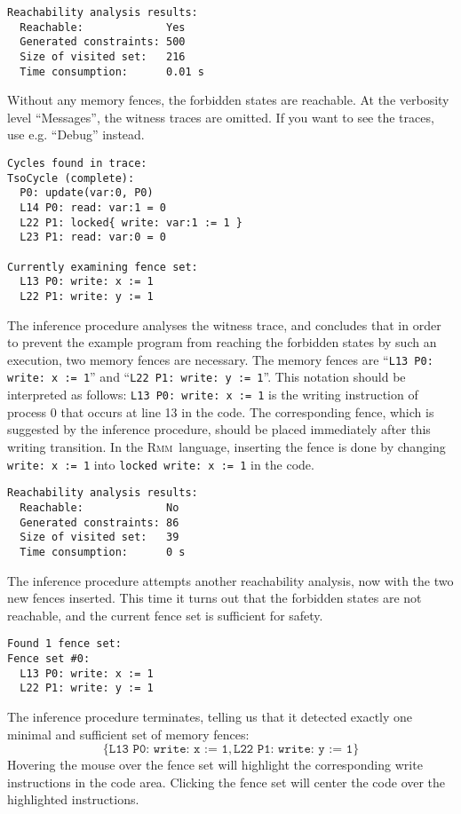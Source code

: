 \documentclass[a4paper]{article}
\newcommand{\rmm}{\textsc{Rmm}}
\begin{document}
\noindent
\begin{verbatim}
Reachability analysis results:
  Reachable:             Yes
  Generated constraints: 500
  Size of visited set:   216
  Time consumption:      0.01 s
\end{verbatim}

Without any memory fences, the forbidden states are reachable. At the
verbosity level ``Messages'', the witness traces are omitted. If you
want to see the traces, use e.g. ``Debug'' instead.

\noindent
\begin{verbatim}
Cycles found in trace:
TsoCycle (complete):
  P0: update(var:0, P0)
  L14 P0: read: var:1 = 0
  L22 P1: locked{ write: var:1 := 1 }
  L23 P1: read: var:0 = 0

Currently examining fence set:
  L13 P0: write: x := 1
  L22 P1: write: y := 1
\end{verbatim}

The inference procedure analyses the witness trace, and concludes that
in order to prevent the example program from reaching the forbidden
states by such an execution, two memory fences are necessary. The
memory fences are ``{\tt L13 P0: write: x := 1}'' and ``{\tt L22 P1:
  write: y := 1}''. This notation should be interpreted as follows:
{\tt L13 P0: write: x := 1} is the writing instruction of process 0
that occurs at line 13 in the code. The corresponding fence, which is
suggested by the inference procedure, should be placed immediately
after this writing transition. In the \rmm\ language, inserting the
fence is done by changing {\tt write: x := 1} into {\tt locked write:
  x := 1} in the code.

\noindent
\begin{verbatim}
Reachability analysis results:
  Reachable:             No
  Generated constraints: 86
  Size of visited set:   39
  Time consumption:      0 s
\end{verbatim}

The inference procedure attempts another reachability analysis, now
with the two new fences inserted. This time it turns out that the
forbidden states are not reachable, and the current fence set is
sufficient for safety.

\noindent
\begin{verbatim}
Found 1 fence set:
Fence set #0:
  L13 P0: write: x := 1
  L22 P1: write: y := 1
\end{verbatim}

The inference procedure terminates, telling us that it detected
exactly one minimal and sufficient set of memory fences:
\begin{displaymath}
\{\texttt{L13 P0: write: x := 1},\texttt{L22 P1: write: y := 1}\}
\end{displaymath}
Hovering the mouse over the fence set will highlight the
corresponding write instructions in the code area. Clicking the fence
set will center the code over the highlighted instructions.
\end{document}

